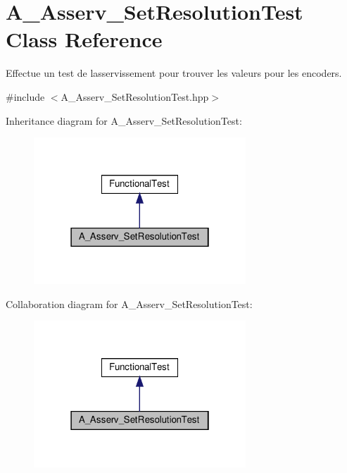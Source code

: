 \hypertarget{classA__Asserv__SetResolutionTest}{}\section{A\+\_\+\+Asserv\+\_\+\+Set\+Resolution\+Test Class Reference}
\label{classA__Asserv__SetResolutionTest}


Effectue un test de l\textquotesingle{}asservissement pour trouver les valeurs pour les encoders.  




{\ttfamily \#include $<$A\+\_\+\+Asserv\+\_\+\+Set\+Resolution\+Test.\+hpp$>$}



Inheritance diagram for A\+\_\+\+Asserv\+\_\+\+Set\+Resolution\+Test\+:
\nopagebreak
\begin{figure}[H]
\begin{center}
\leavevmode
\includegraphics[width=226pt]{classA__Asserv__SetResolutionTest__inherit__graph}
\end{center}
\end{figure}


Collaboration diagram for A\+\_\+\+Asserv\+\_\+\+Set\+Resolution\+Test\+:
\nopagebreak
\begin{figure}[H]
\begin{center}
\leavevmode
\includegraphics[width=226pt]{classA__Asserv__SetResolutionTest__coll__graph}
\end{center}
\end{figure}
